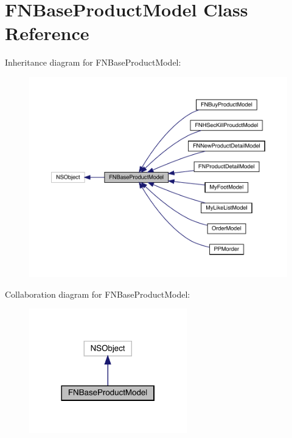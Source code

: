 \hypertarget{interface_f_n_base_product_model}{}\section{F\+N\+Base\+Product\+Model Class Reference}
\label{interface_f_n_base_product_model}


Inheritance diagram for F\+N\+Base\+Product\+Model\+:\nopagebreak
\begin{figure}[H]
\begin{center}
\leavevmode
\includegraphics[width=350pt]{interface_f_n_base_product_model__inherit__graph}
\end{center}
\end{figure}


Collaboration diagram for F\+N\+Base\+Product\+Model\+:\nopagebreak
\begin{figure}[H]
\begin{center}
\leavevmode
\includegraphics[width=194pt]{interface_f_n_base_product_model__coll__graph}
\end{center}
\end{figure}
